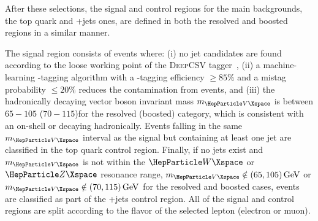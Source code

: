 After these selections, the signal and control regions for the main backgrounds, the top quark and {\PW}+jets ones, are
defined in both the resolved and boosted regions in a similar manner.

The signal region consists of events where:
(i) no {\PQb} jet candidates are found according to the loose working point
of the \textsc{DeepCSV} tagger~\cite{Sirunyan:2017ezt},
(ii) a machine-learning {\PQb}-tagging algorithm with a
{\PQb}-tagging efficiency $\ge85\%$ and a mistag probability $\le20\%$ reduces the contamination
from \ttbar events,
and (iii) the hadronically decaying vector boson
invariant mass $\mvhad$ is between $65-105$ ($70-115$)\GeV for the resolved (boosted) category, which is consistent with
an on-shell {\PW} or {\PZ} decaying hadronically.  Events falling in the same $\mvhad$ interval as the signal but
containing at least one {\PQb} jet are classified in the top quark control region.  Finally, if no {\PQb} jets exist and
$\mvhad$ is not within the $\PW$ or $\PZ$ resonance range, $\mvhad\notin(65 , 105)\GeV$ or $\mvhad\notin(70 , 115)\GeV$
for the resolved and boosted cases, events are classified as part of the {\PW}+jets control region.  All of the signal
and control regions are split according to the flavor of the selected lepton (electron or muon).





